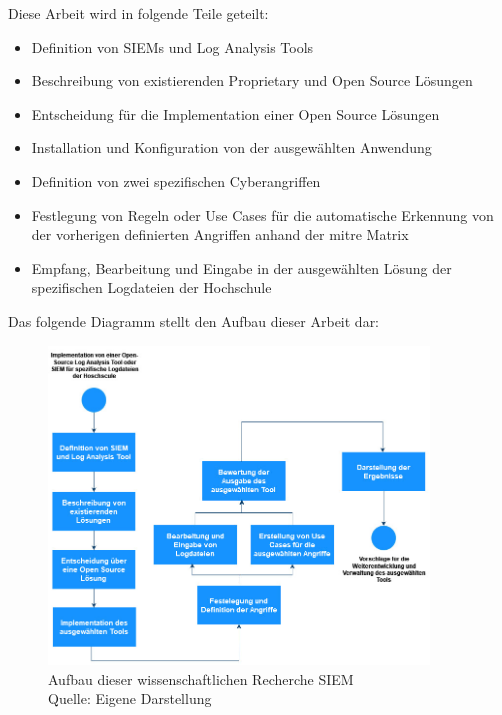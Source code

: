 Diese Arbeit wird in folgende Teile geteilt: 





\begin{itemize}[noitemsep]
   \item	Definition von SIEMs und Log Analysis Tools 
   \item	Beschreibung von existierenden Proprietary und Open Source Lösungen 
   \item	Entscheidung für die Implementation einer Open Source Lösungen 
   \item	Installation und Konfiguration von der ausgewählten Anwendung 
   \item	Definition von zwei spezifischen Cyberangriffen 
   \item	Festlegung von Regeln oder Use Cases für die automatische Erkennung von der vorherigen definierten Angriffen anhand der \gls{mitre} Matrix 
   \item	Empfang, Bearbeitung und Eingabe in der ausgewählten Lösung der spezifischen Logdateien der Hochschule 
\end{itemize}


\newpage
Das folgende Diagramm stellt den Aufbau dieser Arbeit dar:

\begin{figure}[H]
   \centering
   \includegraphics[width=0.9\textwidth]{assets/1_p1.jpg}
   \caption{Aufbau dieser wissenschaftlichen Recherche \gls{SIEM} \\Quelle: Eigene Darstellung }
   \centering
\end{figure}

